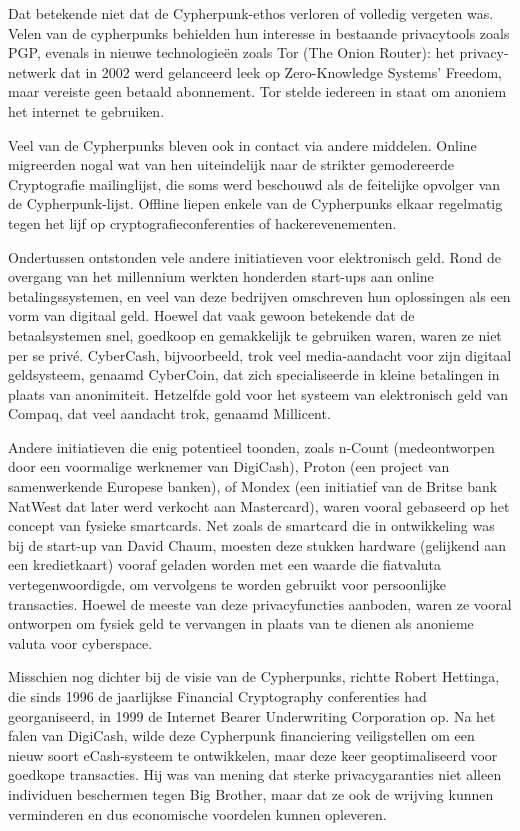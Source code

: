 \documentclass[
  a5paper,
  smalldemyvopaper,11pt,twoside,onecolumn,openright,extrafontsizes,
hidelinks]{memoir}
\begin{document}
Dat betekende niet dat de Cypherpunk-ethos verloren of volledig vergeten
was. Velen van de cypherpunks behielden hun interesse in bestaande
privacytools zoals PGP, evenals in nieuwe technologieën zoals Tor (The
Onion Router): het privacy-netwerk dat in 2002 werd gelanceerd leek op
Zero-Knowledge Systems' Freedom, maar vereiste geen betaald abonnement.
Tor stelde iedereen in staat om anoniem het internet te gebruiken.

Veel van de Cypherpunks bleven ook in contact via andere middelen.
Online migreerden nogal wat van hen uiteindelijk naar de strikter
gemodereerde Cryptografie mailinglijst, die soms werd beschouwd als de
feitelijke opvolger van de Cypherpunk-lijst. Offline liepen enkele van
de Cypherpunks elkaar regelmatig tegen het lijf op
cryptografieconferenties of hackerevenementen.

Ondertussen ontstonden vele andere initiatieven voor elektronisch geld.
Rond de overgang van het millennium werkten honderden start-ups aan
online betalingssystemen, en veel van deze bedrijven omschreven hun
oplossingen als een vorm van digitaal geld. Hoewel dat vaak gewoon
betekende dat de betaalsystemen snel, goedkoop en gemakkelijk te
gebruiken waren, waren ze niet per se privé. CyberCash, bijvoorbeeld,
trok veel media-aandacht voor zijn digitaal geldsysteem, genaamd
CyberCoin, dat zich specialiseerde in kleine betalingen in plaats van
anonimiteit. Hetzelfde gold voor het systeem van elektronisch geld van
Compaq, dat veel aandacht trok, genaamd Millicent.

Andere initiatieven die enig potentieel toonden, zoals n-Count
(medeontworpen door een voormalige werknemer van DigiCash), Proton (een
project van samenwerkende Europese banken), of Mondex (een initiatief
van de Britse bank NatWest dat later werd verkocht aan Mastercard),
waren vooral gebaseerd op het concept van fysieke smartcards. Net zoals
de smartcard die in ontwikkeling was bij de start-up van David Chaum,
moesten deze stukken hardware (gelijkend aan een kredietkaart) vooraf
geladen worden met een waarde die fiatvaluta vertegenwoordigde, om
vervolgens te worden gebruikt voor persoonlijke transacties. Hoewel de
meeste van deze privacyfuncties aanboden, waren ze vooral ontworpen om
fysiek geld te vervangen in plaats van te dienen als anonieme valuta
voor cyberspace.

Misschien nog dichter bij de visie van de Cypherpunks, richtte Robert
Hettinga, die sinds 1996 de jaarlijkse Financial Cryptography
conferenties had georganiseerd, in 1999 de Internet Bearer Underwriting
Corporation op. Na het falen van DigiCash, wilde deze Cypherpunk
financiering veiligstellen om een nieuw soort eCash-systeem te
ontwikkelen, maar deze keer geoptimaliseerd voor goedkope transacties.
Hij was van mening dat sterke privacygaranties niet alleen individuen
beschermen tegen Big Brother, maar dat ze ook de wrijving kunnen
verminderen en dus economische voordelen kunnen opleveren.
\end{document}
